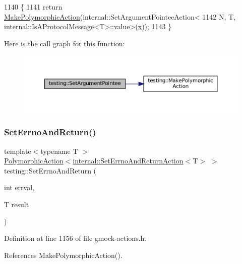 \begin{DoxyCode}
1140                                \{
1141   \textcolor{keywordflow}{return} \hyperlink{namespacetesting_a36bd06c5ea972c6df0bd9f40a7a94c65}{MakePolymorphicAction}(internal::SetArgumentPointeeAction<
1142       N, T, internal::IsAProtocolMessage<T>::value>(\hyperlink{namespaceinteractive__marker_acda52804aef30b460a72fb21ee01d69d}{x}));
1143 \}
\end{DoxyCode}
Here is the call graph for this function\+:
\nopagebreak
\begin{figure}[H]
\begin{center}
\leavevmode
\includegraphics[width=350pt]{namespacetesting_a03b315d27c91a8e719f2b6c09964130b_cgraph}
\end{center}
\end{figure}
\mbox{\label{namespacetesting_a31095e421f167fade2e6d4d60df1f4da}} 
\subsubsection{\texorpdfstring{Set\+Errno\+And\+Return()}{SetErrnoAndReturn()}}
{\footnotesize\ttfamily template$<$typename T $>$ \\
\hyperlink{classtesting_1_1PolymorphicAction}{Polymorphic\+Action}$<$\hyperlink{classtesting_1_1internal_1_1SetErrnoAndReturnAction}{internal\+::\+Set\+Errno\+And\+Return\+Action}$<$T$>$ $>$ testing\+::\+Set\+Errno\+And\+Return (\begin{DoxyParamCaption}\item[{int}]{errval,  }\item[{T}]{result }\end{DoxyParamCaption})}



Definition at line 1156 of file gmock-\/actions.\+h.



References Make\+Polymorphic\+Action().



